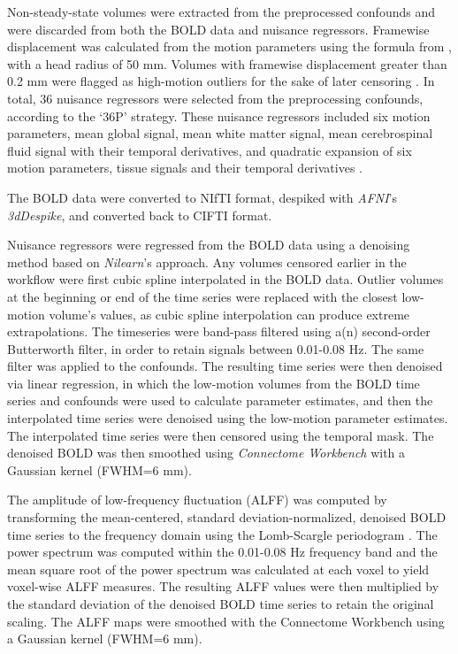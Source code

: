 \documentclass[]{article}
\begin{document}
Non-steady-state volumes were extracted from the preprocessed confounds
and were discarded from both the BOLD data and nuisance regressors.
Framewise displacement was calculated from the motion parameters using
the formula from \citet{power_fd_dvars}, with a head radius of 50 mm.
Volumes with framewise displacement greater than 0.2 mm were flagged as
high-motion outliers for the sake of later censoring
\citep{power_fd_dvars}. In total, 36 nuisance regressors were selected
from the preprocessing confounds, according to the `36P' strategy. These
nuisance regressors included six motion parameters, mean global signal,
mean white matter signal, mean cerebrospinal fluid signal with their
temporal derivatives, and quadratic expansion of six motion parameters,
tissue signals and their temporal derivatives
\citep{benchmarkp, satterthwaite_2013}.

The BOLD data were converted to NIfTI format, despiked with
\emph{AFNI}'s \emph{3dDespike}, and converted back to CIFTI format.

Nuisance regressors were regressed from the BOLD data using a denoising
method based on \emph{Nilearn}'s approach. Any volumes censored earlier
in the workflow were first cubic spline interpolated in the BOLD data.
Outlier volumes at the beginning or end of the time series were replaced
with the closest low-motion volume's values, as cubic spline
interpolation can produce extreme extrapolations. The timeseries were
band-pass filtered using a(n) second-order Butterworth filter, in order
to retain signals between 0.01-0.08 Hz. The same filter was applied to
the confounds. The resulting time series were then denoised via linear
regression, in which the low-motion volumes from the BOLD time series
and confounds were used to calculate parameter estimates, and then the
interpolated time series were denoised using the low-motion parameter
estimates. The interpolated time series were then censored using the
temporal mask. The denoised BOLD was then smoothed using
\emph{Connectome Workbench} with a Gaussian kernel (FWHM=6 mm).

The amplitude of low-frequency fluctuation (ALFF) \citep{alff} was
computed by transforming the mean-centered, standard
deviation-normalized, denoised BOLD time series to the frequency domain
using the Lomb-Scargle periodogram
\citep{lomb1976least, scargle1982studies, townsend2010fast, taylorlomb}.
The power spectrum was computed within the 0.01-0.08 Hz frequency band
and the mean square root of the power spectrum was calculated at each
voxel to yield voxel-wise ALFF measures. The resulting ALFF values were
then multiplied by the standard deviation of the denoised BOLD time
series to retain the original scaling. The ALFF maps were smoothed with
the Connectome Workbench using a Gaussian kernel (FWHM=6 mm).
\end{document}
